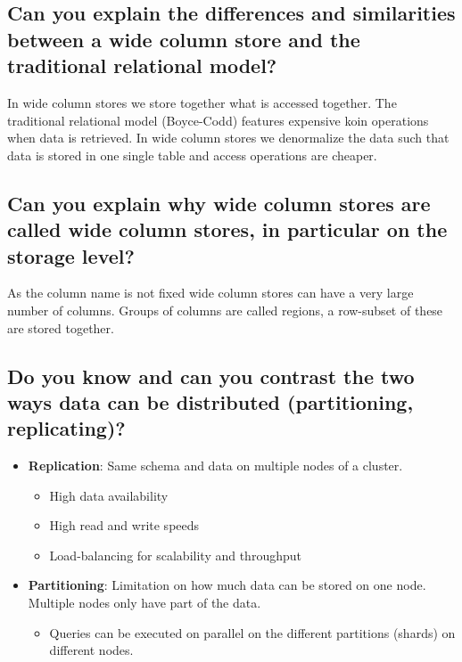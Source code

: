 \documentclass{article}
\begin{document}
\subsection{Can you explain the differences and similarities between a wide column store and the traditional relational model?}

In wide column stores we store together what is accessed together. The traditional relational model (Boyce-Codd) features expensive koin operations when data is retrieved. In wide column stores we denormalize the data such that data is stored in one single table and access operations are cheaper. 


\subsection{Can you explain why wide column stores are called wide column stores, in particular on the storage level?}

As the column name is not fixed wide column stores can have a very large number of columns. Groups of columns are called regions, a row-subset of these are stored together. 

\subsection{Do you know and can you contrast the two ways data can be distributed (partitioning, replicating)?}

\begin{itemize}
    \item \textbf{Replication}: Same schema and data on multiple nodes of a cluster. 
    \begin{itemize}
        \item High data availability
        \item High read and write speeds
        \item Load-balancing for scalability and throughput
    \end{itemize}
    \item \textbf{Partitioning}: Limitation on how much data can be stored on one node. Multiple nodes only have part of the data. 
    \begin{itemize}
        \item Queries can be executed on parallel on the different partitions (shards) on different nodes. 
    \end{itemize}
\end{itemize}
\end{document}
